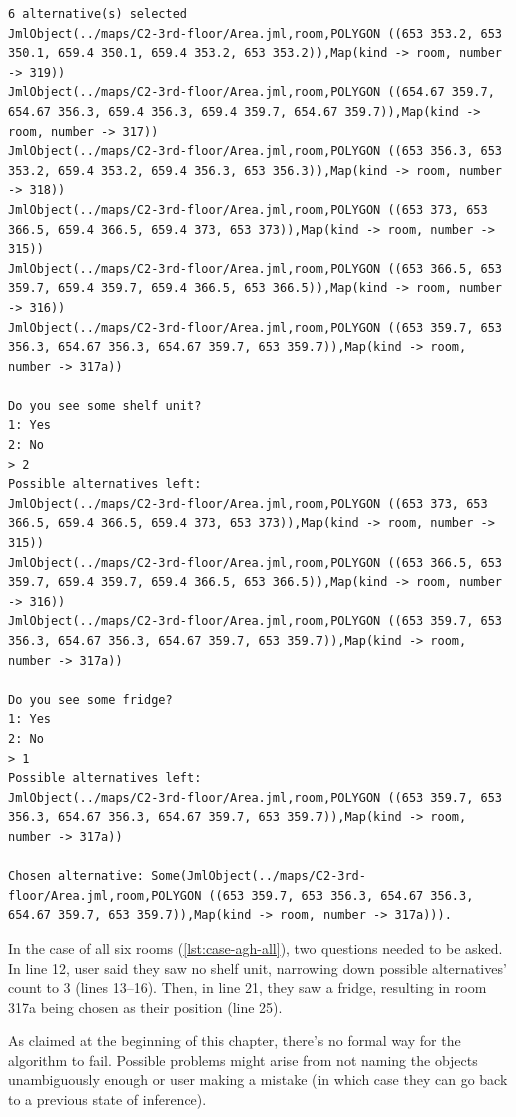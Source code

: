 \begin{lstlisting}[label={lst:case-agh-all},caption={Mediation between all rooms 315--319.}]
6 alternative(s) selected
JmlObject(../maps/C2-3rd-floor/Area.jml,room,POLYGON ((653 353.2, 653 350.1, 659.4 350.1, 659.4 353.2, 653 353.2)),Map(kind -> room, number -> 319))
JmlObject(../maps/C2-3rd-floor/Area.jml,room,POLYGON ((654.67 359.7, 654.67 356.3, 659.4 356.3, 659.4 359.7, 654.67 359.7)),Map(kind -> room, number -> 317))
JmlObject(../maps/C2-3rd-floor/Area.jml,room,POLYGON ((653 356.3, 653 353.2, 659.4 353.2, 659.4 356.3, 653 356.3)),Map(kind -> room, number -> 318))
JmlObject(../maps/C2-3rd-floor/Area.jml,room,POLYGON ((653 373, 653 366.5, 659.4 366.5, 659.4 373, 653 373)),Map(kind -> room, number -> 315))
JmlObject(../maps/C2-3rd-floor/Area.jml,room,POLYGON ((653 366.5, 653 359.7, 659.4 359.7, 659.4 366.5, 653 366.5)),Map(kind -> room, number -> 316))
JmlObject(../maps/C2-3rd-floor/Area.jml,room,POLYGON ((653 359.7, 653 356.3, 654.67 356.3, 654.67 359.7, 653 359.7)),Map(kind -> room, number -> 317a))

Do you see some shelf unit?
1: Yes
2: No
> 2
Possible alternatives left:
JmlObject(../maps/C2-3rd-floor/Area.jml,room,POLYGON ((653 373, 653 366.5, 659.4 366.5, 659.4 373, 653 373)),Map(kind -> room, number -> 315))
JmlObject(../maps/C2-3rd-floor/Area.jml,room,POLYGON ((653 366.5, 653 359.7, 659.4 359.7, 659.4 366.5, 653 366.5)),Map(kind -> room, number -> 316))
JmlObject(../maps/C2-3rd-floor/Area.jml,room,POLYGON ((653 359.7, 653 356.3, 654.67 356.3, 654.67 359.7, 653 359.7)),Map(kind -> room, number -> 317a))

Do you see some fridge?
1: Yes
2: No
> 1
Possible alternatives left:
JmlObject(../maps/C2-3rd-floor/Area.jml,room,POLYGON ((653 359.7, 653 356.3, 654.67 356.3, 654.67 359.7, 653 359.7)),Map(kind -> room, number -> 317a))

Chosen alternative: Some(JmlObject(../maps/C2-3rd-floor/Area.jml,room,POLYGON ((653 359.7, 653 356.3, 654.67 356.3, 654.67 359.7, 653 359.7)),Map(kind -> room, number -> 317a))).
\end{lstlisting}

In the case of all six rooms (\cref{lst:case-agh-all}), two questions needed to be asked. In line 12, user said they saw no shelf unit, narrowing down possible alternatives' count to 3 (lines 13--16). Then, in line 21, they saw a fridge, resulting in room 317a being chosen as their position (line 25).

As claimed at the beginning of this chapter, there's no formal way for the algorithm to fail. Possible problems might arise from not naming the objects unambiguously enough or user making a mistake (in which case they can go back to a previous state of inference).

